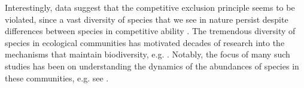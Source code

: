 \documentclass[%
 amsmath,amssymb,
reprint,%
linenumbers]{revtex4-2}
\begin{document}


Interestingly, data suggest that the competitive exclusion principle seems to be violated, since a vast diversity of species that we see in nature persist despite differences between species in competitive ability \cite{hutchinson1961paradox,chesson2000mechanisms}. 
The tremendous diversity of species in ecological communities has motivated decades of research into the mechanisms that maintain biodiversity, e.g. \cite{tilman1982resource,loreau1998biodiversity,verberk2011explaining,lynch2015ecology,fowler2013colonization,barabas2016effect,kalmykov2012mechanistic,kalmykov2013verification}. 
Notably, the focus of many such studies has been on understanding the dynamics of the abundances of species in these communities, e.g. see \cite{leidinger2017biodiversity}.
\end{document}
